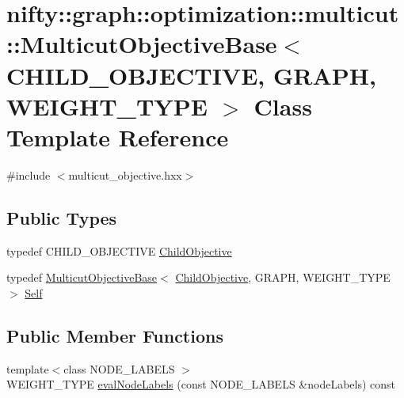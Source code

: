 \hypertarget{classnifty_1_1graph_1_1optimization_1_1multicut_1_1MulticutObjectiveBase}{}\section{nifty\+:\+:graph\+:\+:optimization\+:\+:multicut\+:\+:Multicut\+Objective\+Base$<$ C\+H\+I\+L\+D\+\_\+\+O\+B\+J\+E\+C\+T\+I\+V\+E, G\+R\+A\+P\+H, W\+E\+I\+G\+H\+T\+\_\+\+T\+Y\+P\+E $>$ Class Template Reference}
\label{classnifty_1_1graph_1_1optimization_1_1multicut_1_1MulticutObjectiveBase}


{\ttfamily \#include $<$multicut\+\_\+objective.\+hxx$>$}

\subsection*{Public Types}
\begin{DoxyCompactItemize}
\item 
typedef C\+H\+I\+L\+D\+\_\+\+O\+B\+J\+E\+C\+T\+I\+V\+E \hyperlink{classnifty_1_1graph_1_1optimization_1_1multicut_1_1MulticutObjectiveBase_a256253bb4f2d9c3ebabd67a4b7941ffd}{Child\+Objective}
\item 
typedef \hyperlink{classnifty_1_1graph_1_1optimization_1_1multicut_1_1MulticutObjectiveBase}{Multicut\+Objective\+Base}$<$ \hyperlink{classnifty_1_1graph_1_1optimization_1_1multicut_1_1MulticutObjectiveBase_a256253bb4f2d9c3ebabd67a4b7941ffd}{Child\+Objective}, G\+R\+A\+P\+H, W\+E\+I\+G\+H\+T\+\_\+\+T\+Y\+P\+E $>$ \hyperlink{classnifty_1_1graph_1_1optimization_1_1multicut_1_1MulticutObjectiveBase_a7238b3aeca9c11540455f19509f1ee66}{Self}
\end{DoxyCompactItemize}
\subsection*{Public Member Functions}
\begin{DoxyCompactItemize}
\item 
{\footnotesize template$<$class N\+O\+D\+E\+\_\+\+L\+A\+B\+E\+L\+S $>$ }\\W\+E\+I\+G\+H\+T\+\_\+\+T\+Y\+P\+E \hyperlink{classnifty_1_1graph_1_1optimization_1_1multicut_1_1MulticutObjectiveBase_ad10f46366cf06b8237625ebc6c556165}{eval\+Node\+Labels} (const N\+O\+D\+E\+\_\+\+L\+A\+B\+E\+L\+S \&node\+Labels) const 
\end{DoxyCompactItemize}


